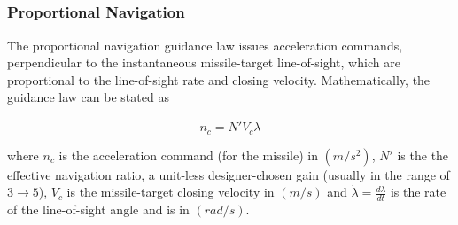 \documentclass{beamer}
\begin{document}
\subsection{} 
\begin{frame}
\frametitle{Proportional Navigation}
The proportional navigation guidance law issues acceleration commands,
perpendicular to the instantaneous missile-target line-of-sight, which are
proportional to the line-of-sight rate and closing velocity. Mathematically, the
guidance law can be stated as

\begin{equation}
n_c= N' V_c \dot{\lambda} \nonumber
\label{PNeq}
\end{equation}

where $n_c$ is the acceleration command (for the missile) in $(m/s^2)$, $N'$ is the the effective navigation ratio, a unit-less designer-chosen gain (usually in the range of $3 \to 5$), $V_c$ is the missile-target closing velocity in $(m/s)$ and $\dot{\lambda} = \frac{d\lambda}{dt}$ is the rate of the line-of-sight angle and is in $(rad/s)$.
\end{frame}
\end{document}

